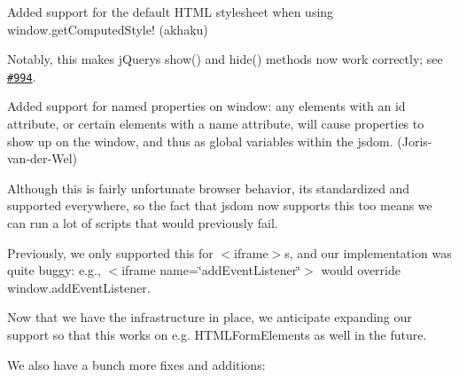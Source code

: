 \begin{DoxyItemize}
\item Added support for the default H\+T\+ML stylesheet when using {\ttfamily window.\+get\+Computed\+Style}! (akhaku)
\begin{DoxyItemize}
\item Notably, this makes j\+Query\textquotesingle{}s {\ttfamily show()} and {\ttfamily hide()} methods now work correctly; see \href{https://github.com/tmpvar/jsdom/issues/994}{\tt \#994}.
\end{DoxyItemize}
\item Added support for named properties on {\ttfamily window}\+: any elements with an {\ttfamily id} attribute, or certain elements with a {\ttfamily name} attribute, will cause properties to show up on the {\ttfamily window}, and thus as global variables within the jsdom. (Joris-\/van-\/der-\/\+Wel)
\begin{DoxyItemize}
\item Although this is fairly unfortunate browser behavior, it\textquotesingle{}s standardized and supported everywhere, so the fact that jsdom now supports this too means we can run a lot of scripts that would previously fail.
\item Previously, we only supported this for {\ttfamily $<$iframe$>$}s, and our implementation was quite buggy\+: e.\+g., {\ttfamily $<$iframe name=\char`\"{}add\+Event\+Listener\char`\"{}$>$} would override {\ttfamily window.\+add\+Event\+Listener}.
\item Now that we have the infrastructure in place, we anticipate expanding our support so that this works on e.\+g. {\ttfamily H\+T\+M\+L\+Form\+Element}s as well in the future.
\end{DoxyItemize}
\end{DoxyItemize}

We also have a bunch more fixes and additions\+:


